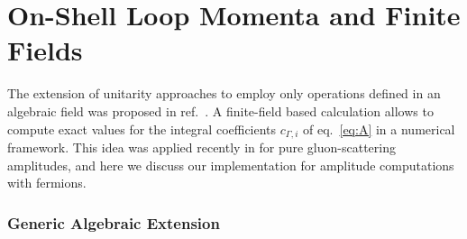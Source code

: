 \section{On-Shell Loop Momenta and Finite Fields}
\label{sec:muij_square_roots}
The extension of unitarity approaches to employ only operations
defined in an algebraic field was proposed 
in ref.~\cite{Peraro:2016wsq}.
A finite-field based calculation allows to compute exact values
for the integral coefficients $c_{\Gamma,i}$ of eq.~\eqref{eq:A}
in a numerical framework.
This idea
was applied recently in \cite{Badger:2017jhb,Abreu:2017hqn} for
pure gluon-scattering amplitudes, and here we discuss our
implementation for amplitude computations with fermions.

\subsubsection{Generic Algebraic Extension}

